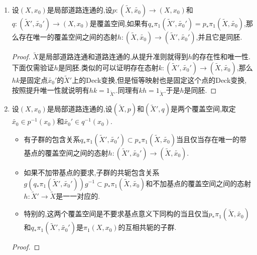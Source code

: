 \begin{enumerate}
\begin{proof}
		上一条证明中的图表就说明我们这里第一个断言.因为如果记下行的共轭映射是$\sigma$,上行的共轭映射是$\Sigma$,那么有:
		$$p_*\pi_1(\widetilde{X},\widetilde{x_0}')=p_*\Sigma\pi_1(\widetilde{X},\widetilde{x_0})=\sigma p_*\pi_1(\widetilde{X},\widetilde{x_0})$$
		
		证明第二件事.设有$x_0$为基点的道路$u$使得$H=[u]p_*\pi_1(\widetilde{X},\widetilde{x_0})[u]$,那么$u$可以提升为$\widetilde{X}$中的以$\widetilde{x_0}$为源端的道路$\widetilde{u}$,它的终端是$Y$中的某个点$\widetilde{x_0}'$.同样考虑上一条证明中的图表,就得到:
		$$H=\sigma p_*\pi_1(\widetilde{X},\widetilde{x_0})=p_*\Sigma\pi_1(\widetilde{X},\widetilde{x_0})=p_*\pi_1(\widetilde{X},\widetilde{x_0}')$$
	\end{proof}
	\item 设$(X,x_0)$是局部道路连通的,设$p:(\widetilde{X},\widetilde{x_0})\to(X,x_0)$和$q:(\widetilde{X}',\widetilde{x_0}')\to(X,x_0)$是覆盖空间,如果有$q_*\pi_1(\widetilde{X}',\widetilde{x_0}')=p_*\pi_1(\widetilde{X},\widetilde{x_0})$,那么存在唯一的覆盖空间之间的态射$h:(\widetilde{X},\widetilde{x_0})\to(\widetilde{X}',\widetilde{x_0}')$,并且它是同胚.
	\begin{proof}
		
		$\widetilde{X}$是局部道路连通和道路连通的,从提升准则就得到$h$的存在性和唯一性.下面仅需验证$h$是同胚.类似的可以证明存在态射$k:(\widetilde{X}',\widetilde{x_0}')\to(\widetilde{X},\widetilde{x_0})$,那么$hk$是固定点$\widetilde{x_0}'$的$\widetilde{X}'$上的Deck变换,但是恒等映射也是固定这个点的Deck变换,按照提升唯一性就说明有$hk=1_{\widetilde{X}'}$.同理有$kh=1_{\widetilde{X}}$.于是$h$是同胚.
	\end{proof}
	\item 设$(X,x_0)$是局部道路连通的,设$(\widetilde{X},p)$和$(\widetilde{X}',q)$是两个覆盖空间,取定$\widetilde{x_0}\in p^{-1}(x_0)$和$\widetilde{x_0}'\in q^{-1}(x_0)$.
	\begin{itemize}
		\item 有子群的包含关系$q_*\pi_1(\widetilde{X}',\widetilde{x_0}')\subset p_*\pi_1(\widetilde{X},\widetilde{x_0})$当且仅当存在唯一的带基点的覆盖空间之间的态射$h:(\widetilde{X}',\widetilde{x_0}')\to(\widetilde{X},\widetilde{x_0})$.
		\item 如果不加带基点的要求,子群的共轭包含关系$g(q_*\pi_1(\widetilde{X}',\widetilde{x_0}'))g^{-1}\subset p_*\pi_1(\widetilde{X},\widetilde{x_0})$和不加基点的覆盖空间之间的态射$h:\widetilde{X}'\to\widetilde{X}$是一一对应的.
		\item 特别的,这两个覆盖空间是不要求基点意义下同构的当且仅当$p_*\pi_1(\widetilde{X},\widetilde{x_0})$和$q_*\pi_1(\widetilde{X}',\widetilde{x_0}')$是$\pi_1(X,x_0)$的互相共轭的子群.
	\end{itemize}
	\begin{proof}
		

\end{proof}
\end{enumerate}
